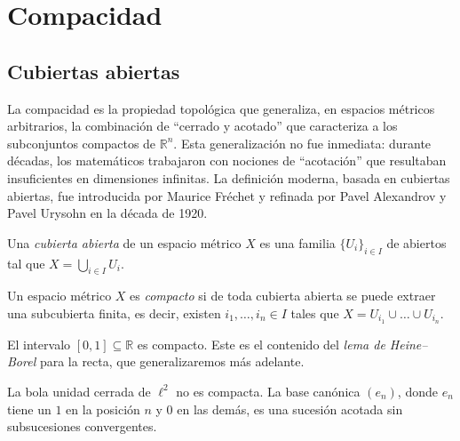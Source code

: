 \chapter{Compacidad}
\label{ch:compacidad}

\section{Cubiertas abiertas}

La compacidad es la propiedad topológica que generaliza, en espacios métricos arbitrarios, la combinación de ``cerrado y acotado'' que caracteriza a los subconjuntos compactos de $\mathbb{R}^n$. Esta generalización no fue inmediata: durante décadas, los matemáticos trabajaron con nociones de ``acotación'' que resultaban insuficientes en dimensiones infinitas. La definición moderna, basada en cubiertas abiertas, fue introducida por Maurice Fréchet y refinada por Pavel Alexandrov y Pavel Urysohn en la década de 1920.

\begin{definition}
\label{def:cubierta}
Una \emph{cubierta abierta} de un espacio métrico $X$ es una familia $\{U_i\}_{i\in I}$ de abiertos tal que $X=\bigcup_{i\in I}U_i$.
\end{definition}

\begin{definition}
\label{def:compacto}
Un espacio métrico $X$ es \emph{compacto} si de toda cubierta abierta se puede extraer una subcubierta finita, es decir, existen $i_1,\dots,i_n\in I$ tales que $X=U_{i_1}\cup\dots\cup U_{i_n}$.
\end{definition}

\begin{example}
\label{ej:intervalo-cerrado}
El intervalo $[0,1]\subseteq\mathbb{R}$ es compacto. Este es el contenido del \emph{lema de Heine--Borel} para la recta, que generalizaremos más adelante.
\end{example}

\begin{example}
\label{ej:bola-unitaria-l2}
La bola unidad cerrada de $\ell^2$ no es compacta. La base canónica $(e_n)$, donde $e_n$ tiene un $1$ en la posición $n$ y $0$ en las demás, es una sucesión acotada sin subsucesiones convergentes.
\end{example}

